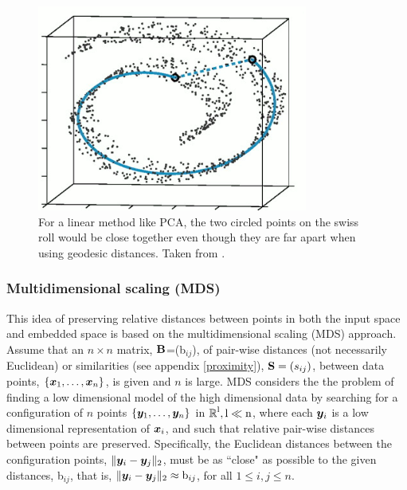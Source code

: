 \begin{figure}[h]
\centering
\includegraphics[width=3.5in]{./images/ISOMAP.png}
\caption{For a linear method like PCA, the two circled points on the swiss roll would be close together even though they are far apart when using geodesic distances. Taken from \cite{TenenbaumJB2000Aggf}.}
      \label{fig:Swiss roll}
\end{figure}


\subsubsection{Multidimensional scaling (MDS)}
This idea of preserving relative distances between points in both the input space and embedded space is based on the multidimensional scaling (MDS) approach. Assume that an $n\times n$ matrix, $\textbf{B}$=(b$_{ij}$), of pair-wise distances (not necessarily Euclidean) or similarities (see appendix \ref{proximity}), $\textbf{S} = (s_{ij})$, between data points, $\{\boldsymbol{x}_{1}, \ldots, \boldsymbol{x}_{n} \}$, is given and $n$ is large.
MDS \cite{CoxT2000, MardiaK.V1979Ma} considers the the problem of finding a low dimensional model of the high dimensional data by searching for a configuration of $n$ points $\{\boldsymbol{y}_{1}, \ldots, \boldsymbol{y}_{n} \}$ in $\operatorname{\mathbb{R}}^{\text{l}}, \text{l} \ll \text{n}$, where each $\boldsymbol{y}_{i}$ is a low dimensional representation of $\boldsymbol{x}_{i}$, and such that relative pair-wise distances between points are preserved. Specifically, the Euclidean distances between the configuration points, $\lVert\boldsymbol{y}_{i} - \boldsymbol{y}_{j}\rVert_{2}$, must be as ``close" as possible to  the given distances, b$_{ij}$, that is, $\lVert\boldsymbol{y}_{i} - \boldsymbol{y}_{j}\rVert_{2} \approx \text{b}_{ij}$, for all $1 \leq i, j \leq n$.

